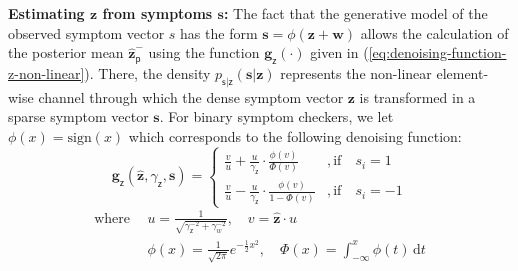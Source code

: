 \documentclass[pmlr,twocolumn,10pt]{jmlr} %
\begin{document}
\noindent \textbf{Estimating $\bm{z}$ from symptoms $\bm{s}$:}
The fact that the generative model of the observed symptom vector $s$ has the form $\mathsf{\mathbf{{s}}} =\phi(\mathsf{\mathbf{{{z}}}} +\mathsf{\mathbf{{{w}}}})$ allows the calculation of the posterior mean $\mathbf{\widehat{z}}^-_{\mathsf{p}}$ using the function $\bm{g}_{\bm{\mathsf{z}}}(\cdot)$ given in (\ref{eq:denoising-function-z-non-linear}). There, the density $p_{\bm{\mathsf{s}}|\bm{\mathsf{z}}}\left(\boldsymbol{s}|\boldsymbol{z}\right)$ represents the non-linear element-wise channel through which the dense symptom vector $\bm{z}$ is transformed in a sparse symptom vector $\bm{s}$. For binary symptom checkers, we let $\phi(x) = \textrm{sign}(x)$ which corresponds to the following denoising function:\vspace{-0.2cm}
\begin{equation}\label{eq:1bit-channel}
\bm{g}_{\bm{\mathsf{z}}}\left(\mathbf{\widehat{z}}, \gamma_{\bm{\mathsf{z}}},\mathbf{s}\right)=
\begin{cases}
\frac{v}{u}+\frac{u}{\gamma_{\bm{\mathsf{z}}}}\cdot \frac{\phi(v)}{\Phi(v)} &, \textrm{if} \quad s_i = 1 \\
\frac{v}{u}-\frac{u}{\gamma_{\bm{\mathsf{z}}}}\cdot \frac{\phi(v)}{1-\Phi(v)} &, \textrm{if} \quad s_i = -1
\end{cases}
\end{equation}
\vspace{-0.5cm}
\begin{subequations}
\begin{align*}
    \textrm{where}~~ &u =\frac{1}{\sqrt{\gamma_{\bm{\mathsf{z}}}^{-2}+\gamma_w^{-2}}}, \quad v =\mathbf{\widehat{z}}\cdot u\\
    &\phi(x) =\frac{1}{\sqrt{2 \pi}} e^{-\frac{1}{2} x^{2}}, \quad\Phi(x) =\int_{-\infty}^{x} \phi(t) \,\textrm{d}t
\end{align*}
\end{subequations}

\vspace{-0.6cm}
\end{document}
